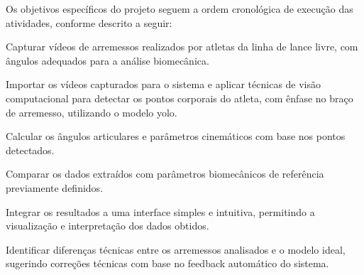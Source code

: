 Os objetivos específicos do projeto seguem a ordem cronológica de execução das atividades, conforme descrito a seguir:

\begin{myitemize}
    \item Capturar vídeos de arremessos realizados por atletas da linha de lance livre, com ângulos adequados para a análise biomecânica.
    
    \item Importar os vídeos capturados para o sistema e aplicar técnicas de visão computacional para detectar os pontos corporais do atleta, com ênfase no braço de arremesso, utilizando o modelo yolo.

    \item Calcular os ângulos articulares e parâmetros cinemáticos com base nos pontos detectados.

    \item Comparar os dados extraídos com parâmetros biomecânicos de referência previamente definidos.

    \item Integrar os resultados a uma interface simples e intuitiva, permitindo a visualização e interpretação dos dados obtidos.

    \item Identificar diferenças técnicas entre os arremessos analisados e o modelo ideal, sugerindo correções técnicas com base no feedback automático do sistema.
\end{myitemize}